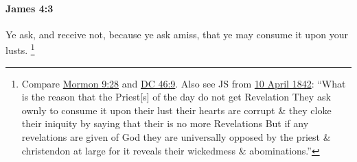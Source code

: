 			\begin{framed}
			\scriptsize
				\begin{compactdesc}
					\item[SBLG] 
				\end{compactdesc}
			\end{framed}

		\paragraph{James 4:3} %
			\label{JAMES-4-3}

			Ye ask, and receive not, because ye ask amiss, that ye may consume it upon your lusts.%
				\footnote{%
					Compare \hyperref[MORMON-9-28]{Mormon 9:28} and \hyperref[DC46-9]{DC 46:9}. Also see JS from \hyperref[EMS-1842-JS-10-APR-1842-WW]{10 April 1842}: ``What is the reason that the Priest[s] of the day do not get Revelation They ask ownly to consume it upon their lust their hearts are corrupt \& they cloke their iniquity by saying that their is no more Revelations But if any revelations are given of God they are universally opposed by the priest \& christendon at large for it reveals their wickedmess \& abominations.''
					}


